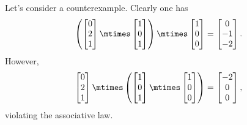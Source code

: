 \begin{solution}
    Let's consider a counterexample.
    Clearly one has
    \begin{equation}
        \left(
        \begin{bmatrix}
            0 \\ 2\\ 1
        \end{bmatrix}\mtimes
        \begin{bmatrix}
            1 \\ 0 \\ 1
        \end{bmatrix}
        \right)
        \mtimes
        \begin{bmatrix}
            1 \\ 0 \\ 0
        \end{bmatrix}
        =
        \begin{bmatrix}
            0 \\-1\\-2
        \end{bmatrix}.
    \end{equation}
    However,
    \begin{equation}
        \begin{bmatrix}
            0 \\ 2\\ 1
        \end{bmatrix}\mtimes \left(\begin{bmatrix}
            1 \\ 0 \\ 1
        \end{bmatrix}\mtimes
        \begin{bmatrix}
            1 \\ 0 \\ 0
        \end{bmatrix}\right)
        =\begin{bmatrix}
            -2 \\0\\0
        \end{bmatrix},
    \end{equation}
    violating the associative law.
\end{solution}

